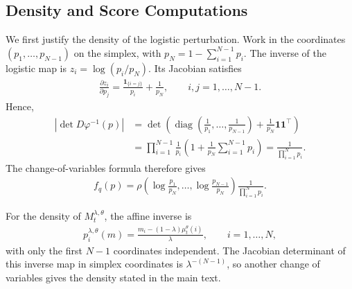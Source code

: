 \subsection{Density and Score Computations}
\label{appendix:discrete-density-proofs}

We first justify the density of the logistic perturbation. Work in the coordinates $(p_1,\ldots,p_{N-1})$ on the simplex, with $p_N=1-\sum_{i=1}^{N-1}p_i$. The inverse of the logistic map is $z_i=\log(p_i/p_N)$. Its Jacobian satisfies
\begin{align}
    \frac{\partial z_i}{\partial p_j}
    =
    \frac{\mathbf 1_{\{i=j\}}}{p_i}
    +
    \frac{1}{p_N},
    \qquad i,j=1,\ldots,N-1.
\end{align}
Hence,
\begin{align}
    \left|\det D\varphi^{-1}(p)\right|
    &=
    \det\left(\operatorname{diag}\left(\frac{1}{p_1},\ldots,\frac{1}{p_{N-1}}\right)
    +
    \frac{1}{p_N}\mathbf 1\mathbf 1^\top\right)\\
    &=
    \prod_{i=1}^{N-1}\frac{1}{p_i}
    \left(1+\frac{1}{p_N}\sum_{i=1}^{N-1}p_i\right)
    =
    \frac{1}{\prod_{i=1}^N p_i}.
\end{align}
The change-of-variables formula therefore gives
\begin{align}
    f_q(p)
    =
    \rho\left(\log\frac{p_1}{p_N},\ldots,\log\frac{p_{N-1}}{p_N}\right)
    \frac{1}{\prod_{i=1}^N p_i}.
\end{align}

For the density of $M_t^{\lambda,\theta}$, the affine inverse is
\begin{align}
    p_i^{\lambda,\theta}(m)
    =
    \frac{m_i-(1-\lambda)\mu_t^\theta(i)}{\lambda},
    \qquad i=1,\ldots,N,
\end{align}
with only the first $N-1$ coordinates independent. The Jacobian determinant of this inverse map in simplex coordinates is $\lambda^{-(N-1)}$, so another change of variables gives the density stated in the main text.

